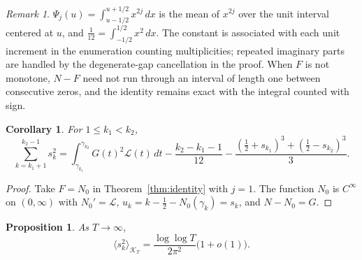 \documentclass[11pt,a4paper]{article}
\makeatletter
\numberwithin{equation}{section}
\DeclareRobustCommand{\CGref}[1]{\ref{#1}}
\let\CG@origref\ref
\newcommand{\CG@gettip}[1]{\@ifundefined{CGTip@#1}{#1}{\csname CGTip@#1\endcsname}}
\DeclareRobustCommand{\CGref}[1]{\pdftooltip{\CG@origref{#1}}{\CG@gettip{#1}}}
\newtheorem{proposition}[theorem]{Proposition}
\newtheorem{corollary}[theorem]{Corollary}
\theoremstyle{definition}
\theoremstyle{remark}
\newtheorem{remark}[theorem]{Remark}
\newcommand{\Nz}{N_0} %
\newcommand{\lL}{\mathcal L}
\newcommand{\Kc}{\mathcal K}
\makeatother
\begin{document}
\begin{remark}\label{rem:twelfth}
$\Psi_j(u)=\int_{u-1/2}^{u+1/2}x^{2j}\,dx$ is the mean of $x^{2j}$ over the unit interval centered at $u$, and $\frac1{12}=\int_{-1/2}^{1/2}x^2\,dx$. The constant is associated with each unit increment in the enumeration counting multiplicities; repeated imaginary parts are handled by the degenerate-gap cancellation in the proof. When $F$ is not monotone, $N-F$ need not run through an interval of length one between consecutive zeros, and the identity remains exact with the integral counted with sign.
\end{remark}

\begin{corollary}\label{cor:identity_distance}
For $1\le k_1<k_2$,
\begin{equation}
\sum_{k=k_1+1}^{k_2-1}s_k^2=\int_{\gamma_{k_1}}^{\gamma_{k_2}}G(t)^2\lL(t)\,dt-\frac{k_2-k_1-1}{12}-\frac{(\frac12+s_{k_1})^3+(\frac12-s_{k_2})^3}3 .
\label{eq:identity_distance}
\end{equation}
\end{corollary}

\begin{proof}
Take $F=\Nz$ in Theorem~\CGref{thm:identity} with $j=1$. The function $\Nz$ is $C^\infty$ on $(0,\infty)$ with $\Nz'=\lL$, $u_k=k-\frac12-\Nz(\gamma_k)=s_k$, and $N-\Nz=G$.
\end{proof}

\begin{proposition}\label{prop:s_meansquare}
As $T\to\infty$,
\begin{equation}
\langle s_k^2\rangle_{\Kc_T}=\frac{\log\log T}{2\pi^2}\bigl(1+o(1)\bigr).
\label{eq:s_meansquare}
\end{equation}
\end{proposition}
\end{document}
